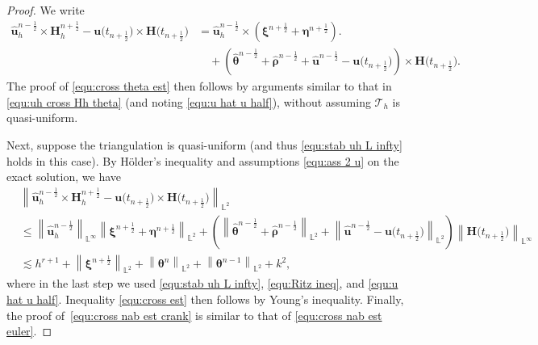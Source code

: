 \documentclass[11pt, reqno]{amsart}
\theoremstyle{definition}
\theoremstyle{remark}
\numberwithin{equation}{section}
\newcommand{\bff}{\boldsymbol}
\newcommand{\bb}{\mathbb}
\newcommand{\norm}[2]{\left\|{#1}\right\|_{#2}}
\begin{document}
\begin{proof}
We write
\begin{align*}
	\nonumber
	\widehat{\bff{u}}_h^{n-\frac{1}{2}} \times \bff{H}_h^{n+\frac{1}{2}} - \bff{u}\big(t_{n+\frac{1}{2}}\big) \times \bff{H}\big(t_{n+\frac{1}{2}}\big)
	&=
	\widehat{\bff{u}}_h^{n-\frac{1}{2}} \times \left(\bff{\xi}^{n+\frac{1}{2}}+\bff{\eta}^{n+\frac{1}{2}}\right).
	\\
	&\quad
	+
	\left(\widehat{\bff{\theta}}^{n-\frac{1}{2}} + \widehat{\bff{\rho}}^{n-\frac{1}{2}} + \widehat{\bff{u}}^{n-\frac{1}{2}} - \bff{u}\big(t_{n+\frac{1}{2}}\big)\right) \times \bff{H}\big(t_{n+\frac{1}{2}}\big).
\end{align*}
The proof of \eqref{equ:cross theta est} then follows by arguments similar to that in \eqref{equ:uh cross Hh theta} (and noting \eqref{equ:u hat u half}), without assuming $\mathcal{T}_h$ is quasi-uniform.

Next, suppose the triangulation is quasi-uniform (and thus \eqref{equ:stab uh L infty} holds in this case). By H\"older's inequality and assumptions \eqref{equ:ass 2 u} on the exact solution, we have
\begin{align*}
	\nonumber
	&\norm{\widehat{\bff{u}}_h^{n-\frac{1}{2}} \times \bff{H}_h^{n+\frac{1}{2}} - \bff{u}\big(t_{n+\frac{1}{2}}\big) \times \bff{H}\big(t_{n+\frac{1}{2}}\big)}{\bb{L}^2}
	\\
	\nonumber
	&\leq
	\norm{\widehat{\bff{u}}_h^{n-\frac{1}{2}}}{\bb{L}^\infty} \norm{\bff{\xi}^{n+\frac{1}{2}}+\bff{\eta}^{n+\frac{1}{2}}}{\bb{L}^2}
	+
	\left( \norm{\widehat{\bff{\theta}}^{n-\frac{1}{2}} + \widehat{\bff{\rho}}^{n-\frac{1}{2}}}{\bb{L}^2} + \norm{\widehat{\bff{u}}^{n-\frac{1}{2}} - \bff{u}\big(t_{n+\frac{1}{2}}\big)}{\bb{L}^2} \right) \norm{\bff{H}\big(t_{n+\frac{1}{2}}\big)}{\bb{L}^\infty}
	\\
	&\lesssim
	h^{r+1} + \norm{\bff{\xi}^{n+\frac{1}{2}}}{\bb{L}^2}
	+ \norm{\bff{\theta}^n}{\bb{L}^2} + \norm{\bff{\theta}^{n-1}}{\bb{L}^2} + k^2,
\end{align*}
where in the last step we used \eqref{equ:stab uh L infty}, \eqref{equ:Ritz ineq}, and \eqref{equ:u hat u half}. Inequality \eqref{equ:cross est} then follows by Young's inequality. Finally, the proof of~\eqref{equ:cross nab est crank} is similar to that of \eqref{equ:cross nab est euler}.
\end{proof}
\end{document}

